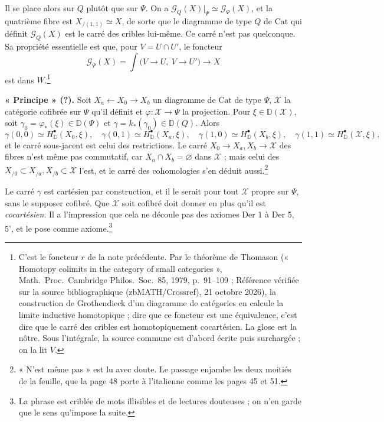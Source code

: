 \documentclass[11pt,a4paper]{article}
\begin{document}
Il se place alors sur $Q$ plutôt que sur $\Psi$. On a $\mathcal{G}_Q(X)|_\Psi
\simeq \mathcal{G}_\Psi(X)$, et la quatrième fibre est $X_{/(1,1)} \simeq X$,
de sorte que le diagramme de type $Q$ de $\mathrm{Cat}$ qui définit
$\mathcal{G}_Q(X)$ est le carré des cribles lui-même. Ce carré n'est pas
quelconque. Sa propriété essentielle est que, pour $V = U \cap U'$, le
foncteur
\[
\mathcal{G}_\Psi(X) = \int \bigl(V \to U,\ V \to U'\bigr) \longrightarrow X
\]
est dans $W$.\footnote{C'est le foncteur $r$ de la note précédente. Par le théorème de Thomason (« Homotopy colimits in the category of small categories », Math.\ Proc.\ Cambridge Philos.\ Soc.\ 85, 1979, p.~91--109 ; Référence vérifiée sur la source bibliographique (zbMATH/Crossref), 21 octobre 2026), la construction de Grothendieck d'un diagramme de
catégories en calcule la limite inductive homotopique ; dire que ce foncteur
est une équivalence, c'est dire que le carré des cribles est
homotopiquement cocartésien. La glose est la nôtre. Sous l'intégrale, la
source commune est d'abord écrite puis surchargée ; on la lit $V$.}

\textbf{« Principe » (?).} Soit $X_a \leftarrow X_0 \rightarrow X_b$ un
diagramme de $\mathrm{Cat}$ de type $\Psi$, $\mathcal{X}$ la catégorie
cofibrée sur $\Psi$ qu'il définit et $\varphi : \mathcal{X} \to \Psi$ la
projection. Pour $\xi \in \mathbb D(\mathcal{X})$, soit $\gamma_0 =
\varphi_*(\xi) \in \mathbb D(\Psi)$ et $\gamma = k_*(\gamma_0) \in \mathbb
D(Q)$. Alors
\[
\gamma(0,0) \simeq H^\bullet_{\mathbb D}(X_0, \xi), \quad
\gamma(0,1) \simeq H^\bullet_{\mathbb D}(X_a, \xi), \quad
\gamma(1,0) \simeq H^\bullet_{\mathbb D}(X_b, \xi), \quad
\gamma(1,1) \simeq H^\bullet_{\mathbb D}(\mathcal{X}, \xi),
\]
et le carré sous-jacent est celui des restrictions. Le carré
$X_0 \to X_a, X_b \to \mathcal{X}$ des fibres n'est même pas commutatif, car
$X_a \cap X_b = \varnothing$ dans $\mathcal{X}$ ; mais celui des
$X_{/0} \subset X_{/a}, X_{/b} \subset \mathcal{X}$ l'est, et le carré des
cohomologies s'en déduit aussi.\footnote{« N'est même pas » est lu avec
doute. Le passage enjambe les deux moitiés de la feuille, que la page 48 porte
à l'italienne comme les pages 45 et 51.}

Le carré $\gamma$ est cartésien par construction, et il le serait pour tout
$\mathcal{X}$ propre sur $\Psi$, sans le supposer cofibré. Que $\mathcal{X}$
soit cofibré doit donner en plus qu'il est \emph{cocartésien}. Il a
l'impression que cela ne découle pas des axiomes Der 1 à Der 5, 5', et le pose
comme axiome.\footnote{La phrase est criblée de mots illisibles et de lectures
douteuses ; on n'en garde que le sens qu'impose la suite.}
\end{document}
